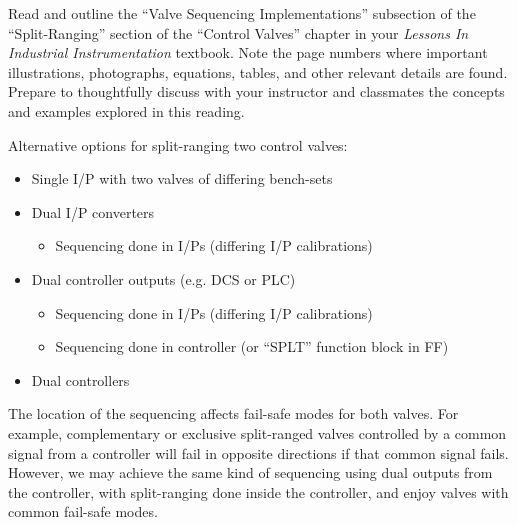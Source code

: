 

Read and outline the ``Valve Sequencing Implementations'' subsection of the ``Split-Ranging'' section of the ``Control Valves'' chapter in your {\it Lessons In Industrial Instrumentation} textbook.  Note the page numbers where important illustrations, photographs, equations, tables, and other relevant details are found.  Prepare to thoughtfully discuss with your instructor and classmates the concepts and examples explored in this reading.














Alternative options for split-ranging two control valves:

\begin{itemize}
\item{} Single I/P with two valves of differing bench-sets 
\item{} Dual I/P converters 
\begin{itemize}

\item{} Sequencing done in I/Ps (differing I/P calibrations)
\end{itemize}
\item{} Dual controller outputs (e.g. DCS or PLC) 
\begin{itemize}

\item{} Sequencing done in I/Ps (differing I/P calibrations)
\item{} Sequencing done in controller (or ``SPLT'' function block in FF)
\end{itemize}
\item{} Dual controllers 
\begin{itemize}

\end{itemize}
\end{itemize}

\vskip 10pt

The location of the sequencing affects fail-safe modes for both valves.  For example, complementary or exclusive split-ranged valves controlled by a common signal from a controller will fail in opposite directions if that common signal fails.  However, we may achieve the same kind of sequencing using dual outputs from the controller, with split-ranging done inside the controller, and enjoy valves with common fail-safe modes.











